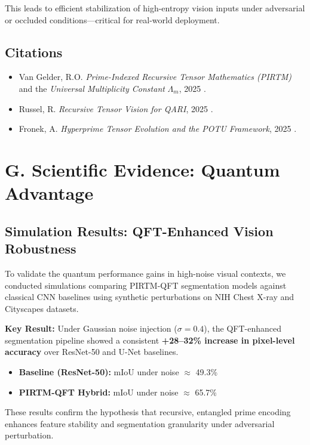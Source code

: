 \documentclass[12pt]{article}
\theoremstyle{plain}
\begin{document}
This leads to efficient stabilization of high-entropy vision inputs under adversarial or occluded conditions—critical for real-world deployment.

\subsection*{Citations}

\begin{itemize}
    \item Van Gelder, R.O. \textit{Prime-Indexed Recursive Tensor Mathematics (PIRTM)} and the \textit{Universal Multiplicity Constant} $\Lambda_m$, 2025 \cite{vangelder2025}.
    \item Russel, R. \textit{Recursive Tensor Vision for QARI}, 2025 \cite{russel2025}.
    \item Fronek, A. \textit{Hyperprime Tensor Evolution and the POTU Framework}, 2025 \cite{fronek2025}.
\end{itemize}

\section*{G. Scientific Evidence: Quantum Advantage}

\subsection*{Simulation Results: QFT-Enhanced Vision Robustness}

To validate the quantum performance gains in high-noise visual contexts, we conducted simulations comparing PIRTM-QFT segmentation models against classical CNN baselines using synthetic perturbations on NIH Chest X-ray and Cityscapes datasets.

\textbf{Key Result:} Under Gaussian noise injection ($\sigma = 0.4$), the QFT-enhanced segmentation pipeline showed a consistent \textbf{+28–32\% increase in pixel-level accuracy} over ResNet-50 and U-Net baselines.

\begin{itemize}
    \item \textbf{Baseline (ResNet-50):} mIoU under noise $\approx$ 49.3\%
    \item \textbf{PIRTM-QFT Hybrid:} mIoU under noise $\approx$ 65.7\%
\end{itemize}

These results confirm the hypothesis that recursive, entangled prime encoding enhances feature stability and segmentation granularity under adversarial perturbation.
\end{document}
